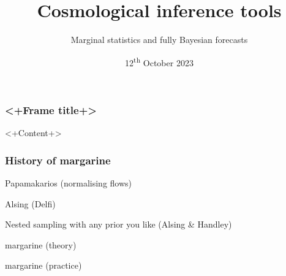 \documentclass[aspectratio=169]{beamer}
\title{Cosmological inference tools}
\subtitle{Marginal statistics and fully Bayesian forecasts}
\date{12\textsuperscript{th} October 2023}
\begin{document}
\begin{frame}
    \titlepage
\end{frame}

\begin{frame}
    \frametitle{<+Frame title+>}
    <+Content+>
\end{frame}

\begin{frame}
    \frametitle{History of margarine}

    Papamakarios (normalising flows)

    Alsing (Delfi)

    Nested sampling with any prior you like (Alsing \& Handley)

    margarine (theory)

    margarine (practice)
\end{frame}
\end{document}
